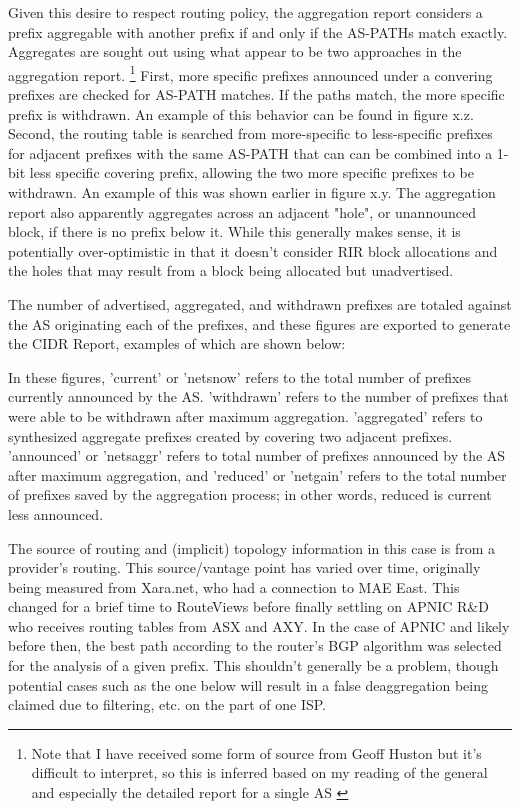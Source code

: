 Given this desire to respect routing policy, the aggregation report considers a prefix aggregable with another prefix if and only if the AS-PATHs match exactly. Aggregates are sought out using what appear to be two approaches in the aggregation report. \footnote{Note that I have received some form of source from Geoff Huston but it's difficult to interpret, so this is inferred based on my reading of the general and especially the detailed report for a single AS \cite{http://www.cidr-report.org/cgi-bin/as-report?as=AS6389&view=2.0}} First, more specific prefixes announced under a convering prefixes are checked for AS-PATH matches. If the paths match, the more specific prefix is withdrawn. An example of this behavior can be found in figure x.z. Second, the routing table is searched from more-specific to less-specific prefixes for adjacent prefixes with the same AS-PATH that can can be combined into a 1-bit less specific covering prefix, allowing the two more specific prefixes to be withdrawn. An example of this was shown earlier in figure x.y. The aggregation report also apparently aggregates across an adjacent "hole", or unannounced block, if there is no prefix below it. While this generally makes sense, it is potentially over-optimistic in that it doesn't consider RIR block allocations and the holes that may result from a block being allocated but unadvertised.

The number of advertised, aggregated, and withdrawn prefixes are totaled against the AS originating each of the prefixes, and these figures are exported to generate the CIDR Report, examples of which are shown below:


In these figures, 'current' or 'netsnow' refers to the total number of prefixes currently announced by the AS. 'withdrawn' refers to the number of prefixes that were able to be withdrawn after maximum aggregation. 'aggregated' refers to synthesized aggregate prefixes created by covering two adjacent prefixes. 'announced' or 'netsaggr' refers to total number of prefixes announced by the AS after maximum aggregation, and 'reduced' or 'netgain' refers to the total number of prefixes saved by the aggregation process; in other words, reduced is current less announced.


The source of routing and (implicit) topology information in this case is from a provider's routing. This source/vantage point has varied over time, originally being measured from Xara.net, who had a connection to MAE East. This changed for a brief time to RouteViews before finally settling on APNIC R\&D who receives routing tables from ASX and AXY. In the case of APNIC and likely before then, the best path according to the router's BGP algorithm was selected for the analysis of a given prefix. This shouldn't generally be a problem, though potential cases such as the one below will result in a false deaggregation being claimed due to filtering, etc. on the part of one ISP.


